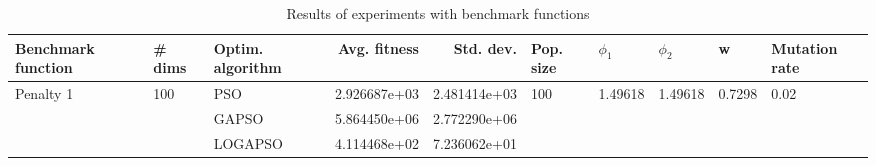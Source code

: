 \begin{table}
\centering
\caption{Results of experiments with benchmark functions}
\begin{tabular}{lllrrlllll}
\toprule
        Benchmark function &              \# dims & Optim. algorithm &  Avg. fitness &    Std. dev. &            Pop. size &               $\phi_{1}$ &               $\phi_{2}$ &                       w &         Mutation rate \\
\midrule
\multirow{3}{*}{Penalty 1} & \multirow{3}{*}{100} &              PSO &  2.926687e+03 & 2.481414e+03 & \multirow{3}{*}{100} & \multirow{3}{*}{1.49618} & \multirow{3}{*}{1.49618} & \multirow{3}{*}{0.7298} & \multirow{3}{*}{0.02} \\
                           &                      &            GAPSO &  5.864450e+06 & 2.772290e+06 &                      &                          &                          &                         &                       \\
                           &                      &          LOGAPSO &  4.114468e+02 & 7.236062e+01 &                      &                          &                          &                         &                       \\
\bottomrule
\end{tabular}
\end{table}
